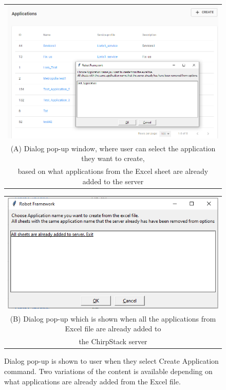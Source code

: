 \clearpage

\begin{figure}[H]
  \centering
  \begin{tabular}{@{}c@{}}
    \includegraphics[width=\textwidth]{illustration/create_new_application_choose_application_dialog.PNG} \\[\abovecaptionskip]
    \small (A) Dialog pop-up window, where user can select the application they want to create, \\ based on what applications from the Excel sheet are already added to the server
  \end{tabular}

  \vspace{\floatsep}

  \begin{tabular}{@{}c@{}}
    \includegraphics[width=12cm]{illustration/all_sheets_are_already_added.PNG} \\[\abovecaptionskip]
    \small (B) Dialog pop-up which is shown when all the applications from Excel file are already added to \\ the ChirpStack server
  \end{tabular}

  \caption{Dialog pop-up is shown to user when they select Create Application command. Two variations of the content is available depending on what applications are already added from the Excel file.}\label{fig:new_application_select_application}
\end{figure}

